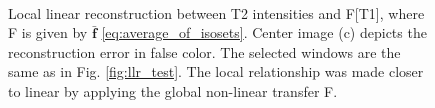 \begin{figure}[t]
    \\
    \caption{{\small Local linear reconstruction between T2 intensities and F[T1], where F is given by $\mathbf{\bar{f}}$ \eqref{eq:average_of_isosets}. Center image (c) depicts the reconstruction error in false color. The selected windows are the same as in Fig. \ref{fig:llr_test}. The local relationship was made closer to linear by applying the global non-linear transfer F.}}
\label{fig:ecc_test_good}\figcloser
\end{figure}


